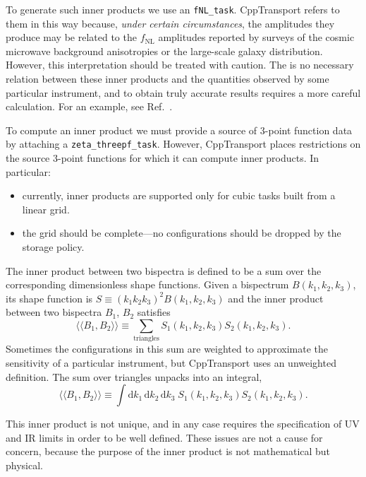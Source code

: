 \documentclass[11pt,a4paper]{article}
\renewcommand{\d}{\mathrm{d}}
\newcommand{\fNL}{f_{\mathrm{NL}}}
\newcommand{\packagefont}{\sffamily}
\newcommand{\CppTransport}{{\packagefont CppTransport}}
\newcommand{\iprod}[2]{\langle\!\langle {#1}, {#2} \rangle\!\rangle}
\begin{document}
To generate such inner products we use an
\texttt{fNL_task}.
{\CppTransport} refers to them in this way because, \emph{under certain circumstances},
the amplitudes they produce may be related to the $\fNL$ amplitudes
reported by surveys of the cosmic microwave background anisotropies
or the large-scale galaxy distribution.
However, this interpretation should be treated with caution.
The is no necessary relation between these inner products and
the quantities observed by some particular instrument,
and to obtain truly accurate results requires a more careful calculation.
For an example, see Ref.~\cite{Byrnes:2015dub}.

To compute an inner product
we must provide a source of 3-point function
data by attaching a \texttt{zeta_threepf_task}.
However, {\CppTransport} places restrictions on the
source 3-point functions for which it can compute inner products.
In particular:
\begin{itemize}
	\item currently, inner products are supported only for
	cubic tasks built from a linear grid.
	\item the grid should be complete---no configurations should
	be dropped by the storage policy.
\end{itemize}

The inner product between two bispectra is defined to be
a sum over the corresponding dimensionless shape functions.
Given a bispectrum $B(k_1, k_2, k_3)$, its shape function is
$S \equiv (k_1 k_2 k_3)^2 B(k_1, k_2, k_3)$
and the inner product between two bispectra
$B_1$, $B_2$ satisfies~\cite{Babich:2004gb,Fergusson:2009nv}
\begin{equation}
	\iprod{B_1}{B_2} \equiv
	\sum_{\text{triangles}}
	S_1(k_1, k_2, k_3) S_2(k_1, k_2, k_3) .	
\end{equation}
Sometimes the configurations in this sum are weighted
to approximate the sensitivity of a particular instrument,
but {\CppTransport} uses an unweighted definition.
The sum over triangles unpacks into an integral,
\begin{equation}
	\iprod{B_1}{B_2} \equiv
	\int \d k_1 \, \d k_2 \, \d k_3 \;
	S_1(k_1, k_2, k_3) S_2(k_1, k_2, k_3) .	
\end{equation}

This inner product is not unique, and in any case requires
the specification of UV and IR limits in order to be well defined.
These issues are not a cause for concern, because the purpose
of the inner product is not mathematical but physical.
\end{document}
